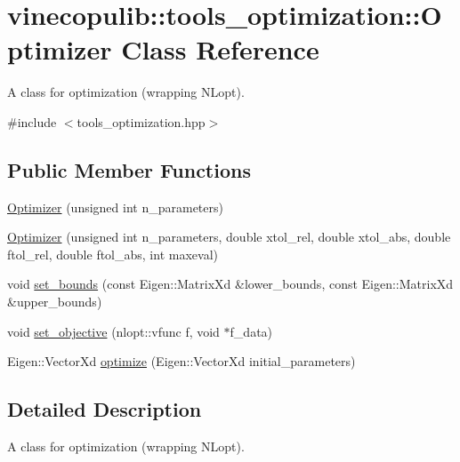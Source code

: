 \hypertarget{classvinecopulib_1_1tools__optimization_1_1_optimizer}{\section{vinecopulib\+:\+:tools\+\_\+optimization\+:\+:Optimizer Class Reference}
\label{classvinecopulib_1_1tools__optimization_1_1_optimizer}
}


A class for optimization (wrapping N\+Lopt).  




{\ttfamily \#include $<$tools\+\_\+optimization.\+hpp$>$}

\subsection*{Public Member Functions}
\begin{DoxyCompactItemize}
\item 
\hyperlink{classvinecopulib_1_1tools__optimization_1_1_optimizer_a1514592e4adccdcc544bb32654e81da1}{Optimizer} (unsigned int n\+\_\+parameters)
\item 
\hyperlink{classvinecopulib_1_1tools__optimization_1_1_optimizer_a43190e80f015257e203c134826857c7c}{Optimizer} (unsigned int n\+\_\+parameters, double xtol\+\_\+rel, double xtol\+\_\+abs, double ftol\+\_\+rel, double ftol\+\_\+abs, int maxeval)
\item 
void \hyperlink{classvinecopulib_1_1tools__optimization_1_1_optimizer_a907419eedf3bb18766d2cb7340a06f7d}{set\+\_\+bounds} (const Eigen\+::\+Matrix\+Xd \&lower\+\_\+bounds, const Eigen\+::\+Matrix\+Xd \&upper\+\_\+bounds)
\item 
void \hyperlink{classvinecopulib_1_1tools__optimization_1_1_optimizer_a14495a0b3219e176fce553beb4a643b9}{set\+\_\+objective} (nlopt\+::vfunc f, void $\ast$f\+\_\+data)
\item 
Eigen\+::\+Vector\+Xd \hyperlink{classvinecopulib_1_1tools__optimization_1_1_optimizer_a3c4fcd7a4d3a792d2a9e57349f271764}{optimize} (Eigen\+::\+Vector\+Xd initial\+\_\+parameters)
\end{DoxyCompactItemize}


\subsection{Detailed Description}
A class for optimization (wrapping N\+Lopt). 

